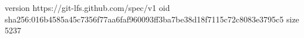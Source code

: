 version https://git-lfs.github.com/spec/v1
oid sha256:016b4585a45c7356f77aa6faf960093ff3ba7be38d18f7115c72c8083e3795c5
size 5237
